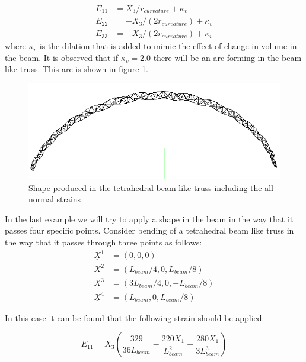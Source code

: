 \begin{equation}
\begin{aligned}
E_{11}&=X_3/r_{curvature}+\kappa_v \\
E_{22}&=-X_3/(2r_{curvature})+\kappa_v \\
E_{33}&=-X_3/(2r_{curvature})+\kappa_v
\end{aligned}
\label{strain_with_dilation:eqn}
\end{equation}
where $\kappa_v$ is the dilation that is added to mimic the effect of change in volume in the beam.
It is observed that if $\kappa_v=2.0$ there will be an arc forming in the beam like truss.
This arc is shown in figure \ref{fig:tetra_hedral_arc_2_pi_shape_with_pressure}.
\begin{figure} 
\centering
\includegraphics[width=5.0in]{./chap_5_active_trusses/images_linear_tetrahedral/tetra_hedral_arc_2_pi_shape_with_pressure.png}
\caption{Shape produced in the tetrahedral beam like truss including the all normal strains}
\label{fig:tetra_hedral_arc_2_pi_shape_with_pressure}
\end{figure} 

In the last example we will try to apply a shape in the beam in the way that it passes four specific points.
Consider bending of a tetrahedral beam like truss in the way that it passes through three points as follows:
\begin{equation}
\begin{aligned}
\underline X ^1&=(0,0,0) \\
\underline X ^2&=(L_{beam}/4,0,L_{beam}/8) \\
\underline X ^3&=(3 L_{beam}/4,0,-L_{beam}/8) \\
\underline X ^4&=(L_{beam},0,L_{beam}/8)
\end{aligned}
\label{three_points:eqn}
\end{equation}

In this case it can be found that the following strain should be applied:

\begin{equation}
E_{11}=X_3 \left(
\frac{329}{36L_{beam}} -
\frac{220 X_1}{L_{beam}^2} +
\frac{280 X_1}{ 3 L_{beam}^3}  \right)
\label{three_points_strain:eqn}
\end{equation}


